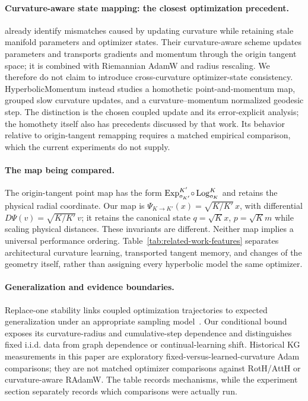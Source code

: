 \paragraph{Curvature-aware state mapping: the closest optimization precedent.}
\citet{bdeir2025robust} already identify mismatches caused by updating curvature while retaining stale manifold parameters and optimizer states. Their curvature-aware scheme updates parameters and transports gradients and momentum through the origin tangent space; it is combined with Riemannian AdamW and radius rescaling. We therefore do not claim to introduce cross-curvature optimizer-state consistency. HyperbolicMomentum instead studies a homothetic point-and-momentum map, grouped slow curvature updates, and a curvature--momentum normalized geodesic step. The distinction is the chosen coupled update and its error-explicit analysis; the homothety itself also has precedents discussed by that work. Its behavior relative to origin-tangent remapping requires a matched empirical comparison, which the current experiments do not supply.



\paragraph{The map being compared.}
The origin-tangent point map has the form
$\operatorname{Exp}_{o_{K'}}^{K'}\!\circ\operatorname{Log}_{o_K}^{K}$ and retains the physical radial coordinate. Our map is
$\Psi_{K\to K'}(x)=\sqrt{K/K'}\,x$, with differential
$D\Psi(v)=\sqrt{K/K'}\,v$; it retains the canonical state
$q=\sqrt Kx$, $p=\sqrt Km$ while scaling physical distances.
These invariants are different. Neither map implies a universal performance ordering. Table~\ref{tab:related-work-features} separates architectural curvature learning, transported tangent memory, and changes of the geometry itself, rather than assigning every hyperbolic model the same optimizer.

\paragraph{Generalization and evidence boundaries.}
Replace-one stability links coupled optimization trajectories to expected generalization under an appropriate sampling model~\citep{hardt2016stability}. Our conditional bound exposes its curvature-radius and cumulative-step dependence and distinguishes fixed i.i.d. data from graph dependence or continual-learning shift. Historical KG measurements in this paper are exploratory fixed-versus-learned-curvature Adam comparisons; they are not matched optimizer comparisons against RotH/AttH or curvature-aware RAdamW. The table records mechanisms, while the experiment section separately records which comparisons were actually run.

